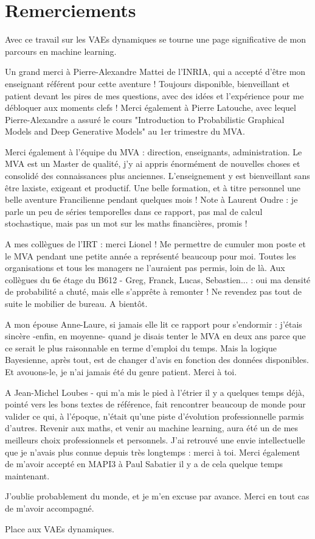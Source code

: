 \chapter{Remerciements}\label{sec:Remerciements}

Avec ce travail sur les VAEs dynamiques se tourne une page significative de mon parcours en machine learning.

Un grand merci à Pierre-Alexandre Mattei de l'INRIA, qui a accepté d'être mon enseignant référent pour cette aventure !
Toujours disponible, bienveillant et patient devant les pires de mes questions, avec des idées et l'expérience 
pour me débloquer aux moments clefs ! Merci également à Pierre Latouche, avec lequel Pierre-Alexandre a assuré 
le cours "Introduction to Probabilistic Graphical Models and Deep Generative Models" au 1er trimestre du MVA.

Merci également à l'équipe du MVA : direction, enseignants, administration. Le MVA est un Master de qualité, j'y ai appris 
énormément de nouvelles choses et consolidé des connaissances plus anciennes. L'enseignement y est bienveillant sans 
\^etre laxiste, exigeant et productif. Une belle formation, et à titre personnel une belle aventure Francilienne 
pendant quelques mois ! Note à Laurent Oudre : je parle un peu de séries temporelles dans ce rapport, pas mal de 
calcul stochastique, mais pas un mot sur les maths financières, promis !

A mes collègues de l'IRT : merci Lionel ! Me permettre de cumuler mon poste et le MVA pendant une petite année a 
représenté beaucoup pour moi. Toutes les organisations et tous les managers ne l'auraient pas permis, loin de là. 
Aux collègues du 6e étage du B612 - Greg, Franck, Lucas, Sebastien... : oui ma densité de probabilité a chuté, 
mais elle s'apprête à remonter ! Ne revendez pas tout de suite le mobilier de bureau. A bientôt.

A mon épouse Anne-Laure, si jamais elle lit ce rapport pour s'endormir : j'étais sincère -enfin, en moyenne- 
quand je disais tenter le MVA en deux ans parce que ce serait le plus raisonnable en terme d'emploi du temps. 
Mais la logique Bayesienne, après tout, est de changer d'avis en fonction des données disponibles. 
Et avouons-le, je n'ai jamais été du genre patient. Merci à toi.

A Jean-Michel Loubes - qui m'a mis le pied à l'étrier il y a quelques temps déjà, pointé vers les bons textes de référence, fait 
rencontrer beaucoup de monde pour valider ce qui, à l'époque, n'était qu'une piste d'évolution professionnelle parmis d'autres. 
Revenir aux maths, et venir au machine learning, aura été un de mes meilleurs choix professionnels et personnels. 
J'ai retrouvé une envie intellectuelle que je n'avais plus connue depuis très longtemps : merci à toi. 
Merci également de m'avoir accepté en MAPI3 à Paul Sabatier il y a de cela quelque temps maintenant.

J'oublie probablement du monde, et je m'en excuse par avance. Merci en tout cas de m'avoir accompagné.

Place aux VAEs dynamiques.